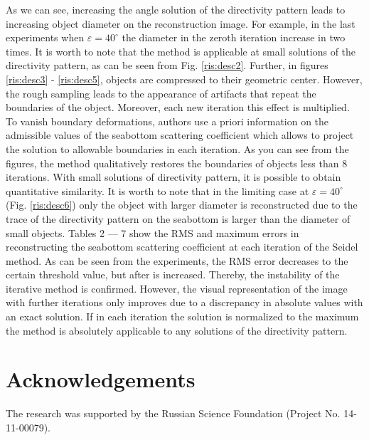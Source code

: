 \documentclass{procDDs}
\begin{document}
As we can see, increasing the angle solution of the directivity pattern leads to increasing object diameter on the reconstruction image. For example, in the last experiments when $\varepsilon=40^\circ$ the diameter in the zeroth iteration increase in two times. It is worth to note that the method is applicable at small solutions of the directivity pattern, as can be seen from Fig. \ref{ris:desc2}. Further, in figures \ref{ris:desc3} - \ref{ris:desc5}, objects are compressed to their geometric center. However, the rough sampling leads to the appearance of artifacts that repeat the boundaries of the object. Moreover, each new iteration this effect is multiplied. To vanish boundary deformations, authors use a priori information on the admissible values of the seabottom scattering coefficient which allows to project the solution to allowable boundaries in each iteration. As you can see from the figures, the method qualitatively restores the boundaries of objects less than 8 iterations. With small solutions of directivity pattern, it is possible to obtain quantitative similarity. It is worth to note that in the limiting case at $\varepsilon = 40^\circ$ (Fig. \ref{ris:desc6}) only the object with larger diameter is reconstructed due to the trace of the directivity pattern on the seabottom is larger than the diameter of small objects. Tables 2 --- 7 show the RMS and maximum errors in reconstructing the seabottom scattering coefficient at each iteration of the Seidel method. As can be seen from the experiments, the RMS error decreases to the certain threshold value, but after is increased. Thereby, the instability of the iterative method is confirmed. However, the visual representation of the image with further iterations only improves due to a discrepancy in absolute values with an exact solution. If in each iteration the solution is normalized to the maximum the method is absolutely applicable to any solutions of the directivity pattern.

\section*{Acknowledgements}
The research was supported by the Russian Science Foundation (Project No. 14-11-00079).

\end{document}
